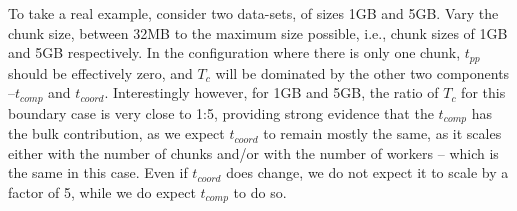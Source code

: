 \documentclass[conference,final]{IEEEtran}
\newcommand{\tc }{ $T_c$ }
\begin{document}
To take a real example, consider two data-sets, of sizes 1GB and 5GB.
Vary the chunk size, between 32MB to the maximum size possible, i.e.,
chunk sizes of 1GB and 5GB respectively. In the configuration where
there is only one chunk, $t_{pp}$ should be effectively zero, and \tc
will be dominated by the other two components --$t_{comp}$ and
$t_{coord}$.  Interestingly however, for 1GB and 5GB, the ratio of \tc
for this boundary case is very close to 1:5, providing strong evidence
that the $t_{comp}$ has the bulk contribution, as we expect
$t_{coord}$ to remain mostly the same, as it scales either with the number 
of chunks and/or with the number of workers -- which is 
the same in this case.  Even if $t_{coord}$ does change, we do not
expect it to scale by a factor of 5, while we do expect $t_{comp}$ to
do so.








\end{document}
